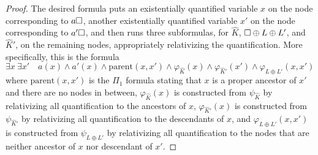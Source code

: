 \documentclass{LMCS}
\begin{document}
\begin{proof}
The desired \Stwo formula puts an existentially quantified variable $x$ on the
node corresponding to $a\Box$, another existentially quantified
variable $x'$ on the node corresponding to $a'\Box$, and then runs
three subformulas, for $\hat K$, $\Box \oplus L \oplus L'$, and $\hat
K'$, on the remaining nodes, appropriately relativizing the quantification. More specifically, this is the formula
\[
  \exists x \ \exists x'  \quad a(x) \wedge a'(x) \wedge \text{parent}(x,x') \wedge \varphi_{\hat K}(x) \wedge
  \varphi_{\hat K'}(x') \wedge \varphi_{L \oplus L'}(x,x')
\]
where $\text{parent}(x,x')$ is the $\Pi_1$ formula stating that $x$ is a proper ancestor of $x'$ and there are no nodes in between, $\varphi_{\hat K}(x)$ is constructed from $\psi_{\hat K}$ by relativizing
all quantification to the ancestors of $x$, $\varphi_{\hat K'}(x)$ is constructed from $\psi_{\hat K'}$ by relativizing
all quantification to the descendants of $x$, and $\varphi_{L \oplus L'}(x,x')$ is
constructed from $\psi_{L \oplus L'}$ by relativizing all quantification to the
nodes that are neither ancestor of $x$ nor descendant of $x'$.
\end{proof}
\end{document}
